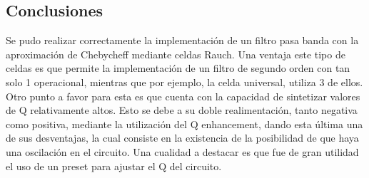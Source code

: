 \subsection{Conclusiones}
Se pudo realizar correctamente la implementación de un filtro pasa banda con la aproximación de Chebycheff mediante celdas Rauch. Una ventaja este tipo de celdas es que permite la implementación de un filtro de segundo orden con tan solo 1 operacional, mientras que por ejemplo, la celda universal, utiliza 3 de ellos. Otro punto a favor para esta es que cuenta con la capacidad de sintetizar valores de Q relativamente altos. Esto se debe a su doble realimentación, tanto negativa como positiva, mediante la utilización del Q enhancement, dando esta última una de sus desventajas, la cual consiste en la existencia de la posibilidad de que haya una oscilación en el circuito. Una cualidad a destacar es que fue de gran utilidad el uso de un preset para ajustar el Q del circuito.